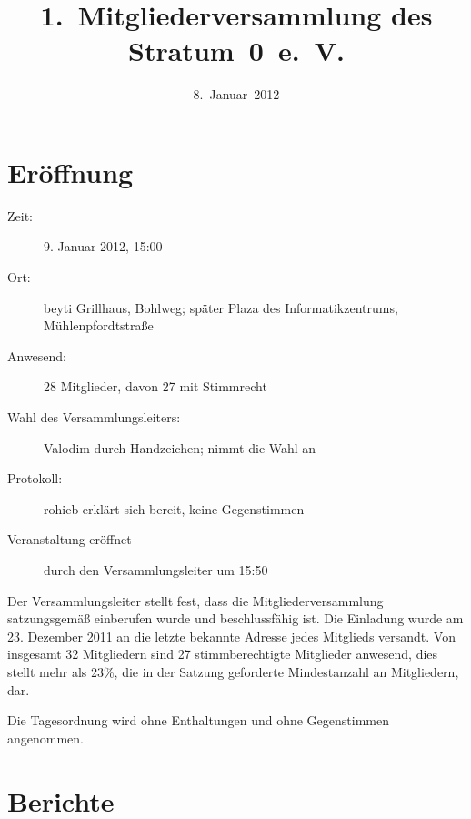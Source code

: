 \documentclass[a4paper,12pt]{scrartcl}
\title{1.~Mitgliederversammlung des Stratum~0~e.~V.}
\date{8.~Januar~2012}
\begin{document}
\maketitle

\section{Eröffnung}
\begin{description}
  \item[Zeit:] 9. Januar 2012, 15:00
  \item[Ort:] beyti Grillhaus, Bohlweg; später Plaza des Informatikzentrums,
    Mühlenpfordtstraße
  \item[Anwesend:] 28 Mitglieder, davon 27 mit Stimmrecht
  \item[Wahl des Versammlungsleiters:] Valodim durch Handzeichen; nimmt die
    Wahl an
  \item[Protokoll:] rohieb erklärt sich bereit, keine Gegenstimmen
  \item[Veranstaltung eröffnet] durch den Versammlungsleiter um 15:50
\end{description}

Der Versammlungsleiter stellt fest, dass die Mitgliederversammlung satzungsgemäß
einberufen wurde und beschlussfähig ist. Die Einladung wurde am 23.  Dezember
2011 an die letzte bekannte Adresse jedes Mitglieds versandt. Von insgesamt 32
Mitgliedern sind 27 stimmberechtigte Mitglieder anwesend, dies stellt mehr als
23\%, die in der Satzung geforderte Mindestanzahl an Mitgliedern, dar.

Die Tagesordnung wird ohne Enthaltungen und ohne Gegenstimmen angenommen.

\section{Berichte}
\end{document}
